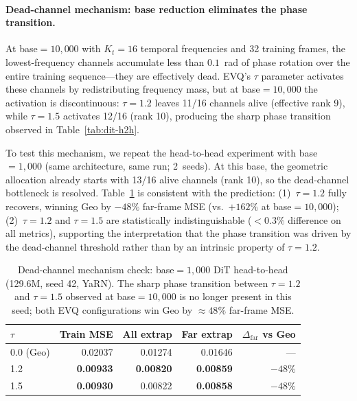 \paragraph{Dead-channel mechanism: base reduction eliminates the phase transition.}
At base${}=10{,}000$ with $K_t{=}16$ temporal frequencies and 32 training frames, the lowest-frequency channels accumulate less than $0.1$~rad of phase rotation over the entire training sequence---they are effectively dead. EVQ's $\tau$ parameter activates these channels by redistributing frequency mass, but at base${}=10{,}000$ the activation is discontinuous: $\tau{=}1.2$ leaves 11/16 channels alive (effective rank 9), while $\tau{=}1.5$ activates 12/16 (rank 10), producing the sharp phase transition observed in Table~\ref{tab:dit-h2h}.

To test this mechanism, we repeat the head-to-head experiment with base${}=1{,}000$ (same architecture, same run; 2~seeds). At this base, the geometric allocation already starts with 13/16 alive channels (rank 10), so the dead-channel bottleneck is resolved. Table~\ref{tab:dit-base1000} is consistent with the prediction: (1)~$\tau{=}1.2$ fully recovers, winning Geo by $-48\%$ far-frame MSE (vs.\ $+162\%$ at base${}=10{,}000$); (2)~$\tau{=}1.2$ and $\tau{=}1.5$ are statistically indistinguishable ($<0.3\%$ difference on all metrics), supporting the interpretation that the phase transition was driven by the dead-channel threshold rather than by an intrinsic property of $\tau{=}1.2$.

\begin{table}[ht]
\caption{Dead-channel mechanism check: base${}=1{,}000$ DiT head-to-head (129.6M, seed 42, YaRN). The sharp phase transition between $\tau{=}1.2$ and $\tau{=}1.5$ observed at base${}=10{,}000$ is no longer present in this seed; both EVQ configurations win Geo by ${\approx}48\%$ far-frame MSE.}
\label{tab:dit-base1000}
\centering
\small
\begin{tabular}{@{}l r r r r@{}}
\toprule
$\tau$ & Train MSE & All extrap & Far extrap & $\Delta_\text{far}$ vs Geo \\
\midrule
0.0 (Geo) & 0.02037 & 0.01274 & 0.01646 & --- \\
1.2 & \textbf{0.00933} & \textbf{0.00820} & \textbf{0.00859} & $-48\%$ \\
1.5 & \textbf{0.00930} & 0.00822 & \textbf{0.00858} & $-48\%$ \\
\bottomrule
\end{tabular}
\end{table}

